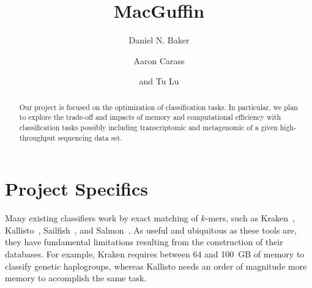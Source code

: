 \documentclass{elsarticle}
\begin{document}


\begin{frontmatter}
%
\title{MacGuffin}
%
\author{Daniel N. Baker}
%
\author{Aaron Carass}
%
\author{and Tu Lu}

\begin{abstract}
%
Our project is focused on the optimization of classification tasks.
In particular, we plan to explore the trade-off and impacts of memory
and computational efficiency with classification tasks possibly
including transcriptomic and metagenomic of a given high-throughput
sequencing data set.
%
\end{abstract}

\end{frontmatter}


\section{Project Specifics}
%
\label{s:ps}
%
Many existing classifiers work by exact matching of $k$-mers, such as
Kraken~\citep{wood2014gb}, Kallisto~\citep{bray2016},
Sailfish~\citep{patro2014nbioptech}, and
Salmon~\citep{patro2015bioRxiv}. As useful and ubiquitous as these
tools are, they have fundamental limitations resulting from the
construction of their databases. For example, Kraken requires between
64 and 100~GB of memory to classify genetic haplogroups, whereas
Kallisto needs an order of magnitude more memory to accomplish the
same task.
\end{document}
